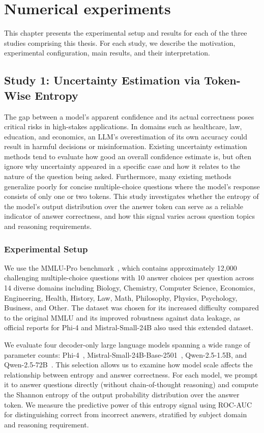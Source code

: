 \chapter{Numerical experiments}

This chapter presents the experimental setup and results for each of the three studies comprising this thesis. For each study, we describe the motivation, experimental configuration, main results, and their interpretation.

\section{Study 1: Uncertainty Estimation via Token-Wise Entropy}

The gap between a model's apparent confidence and its actual correctness poses critical risks in high-stakes applications. In domains such as healthcare, law, education, and economics, an LLM's overestimation of its own accuracy could result in harmful decisions or misinformation. Existing uncertainty estimation methods tend to evaluate how good an overall confidence estimate is, but often ignore why uncertainty appeared in a specific case and how it relates to the nature of the question being asked. Furthermore, many existing methods generalize poorly for concise multiple-choice questions where the model's response consists of only one or two tokens. This study investigates whether the entropy of the model's output distribution over the answer token can serve as a reliable indicator of answer correctness, and how this signal varies across question topics and reasoning requirements.

\subsection{Experimental Setup}

We use the MMLU-Pro benchmark~\cite{wang2024mmlu}, which contains approximately 12,000 challenging multiple-choice questions with 10 answer choices per question across 14 diverse domains including Biology, Chemistry, Computer Science, Economics, Engineering, Health, History, Law, Math, Philosophy, Physics, Psychology, Business, and Other. The dataset was chosen for its increased difficulty compared to the original MMLU and its improved robustness against data leakage, as official reports for Phi-4 and Mistral-Small-24B also used this extended dataset.

We evaluate four decoder-only large language models spanning a wide range of parameter counts: Phi-4~\cite{abdin2024phi}, Mistral-Small-24B-Base-2501~\cite{jiang2023mistral}, Qwen-2.5-1.5B, and Qwen-2.5-72B~\cite{qwen2024}. This selection allows us to examine how model scale affects the relationship between entropy and answer correctness. For each model, we prompt it to answer questions directly (without chain-of-thought reasoning) and compute the Shannon entropy of the output probability distribution over the answer token. We measure the predictive power of this entropy signal using ROC-AUC for distinguishing correct from incorrect answers, stratified by subject domain and reasoning requirement.

